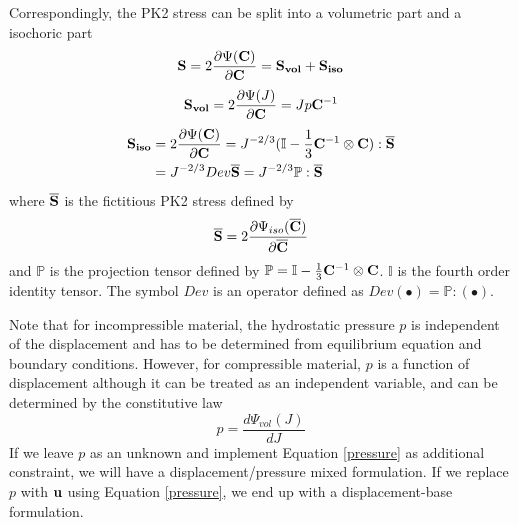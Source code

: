 Correspondingly, the PK2 stress can be split into a volumetric part and a isochoric part
\begin{equation} \label{S}
\bold{S} =  2\frac{\partial{\Psi({\bold{C})}}}{\partial{\bold{C}}} = \bold{S_{vol}}  + \bold{S_{iso}} 
\end{equation}
\begin{equation} \label{Svol}
\bold{S_{vol}} = 2\frac{\partial{\Psi(J)}}{\partial{\bold{C}}} = Jp{\bold{C}} ^{-1}
\end{equation}
\begin{equation} \label{Siso}
\begin{split}
\bold{S_{iso}} & = 2\frac{\partial{\Psi({\bold{C})}}}{\partial{\bold{C}}} = J^{-2/3}(\mathbb{I} - \frac{1}{3}\bold{C}^{-1} \otimes \bold{C}):\overline{\bold{S}} \\
&  = J^{-2/3}Dev\overline{\bold{S}} = J^{-2/3}\mathbb{P}:\overline{\bold{S}}
\end{split}
\end{equation}
where  $\overline{\bold{S}}$ is the fictitious PK2 stress defined by
\begin{equation} \label{fictitious}
\overline{\bold{S}} = 2\frac{\partial\Psi_{iso}({\overline{\bold{C}})}}{\partial\overline{\bold{C}}}
\end{equation}
and $\mathbb{P}$ is the projection tensor defined by $\mathbb{P} = \mathbb{I} - \frac{1}{3}\bold{C}^{-1} \otimes \bold{C} $. $\mathbb{I}$ is the fourth order identity tensor. The symbol $Dev$ is an operator defined as $Dev(\bullet) = \mathbb{P}:(\bullet)$.

Note that for incompressible material, the hydrostatic pressure $p$ is independent of the displacement and has to be determined from equilibrium equation and boundary conditions. However, for compressible material,  $p$ is a function of displacement although it can be treated as an independent variable, and can be determined by the constitutive law
\begin{equation} \label{pressure}
p = \frac{d\Psi_{vol}(J)}{dJ}
\end{equation}
If we leave $p$ as an unknown and implement Equation \ref{pressure} as additional constraint, we will have a displacement/pressure mixed formulation. If we replace $p$ with $\bold{u}$ using Equation \ref{pressure}, we end up with a displacement-base formulation.

%
